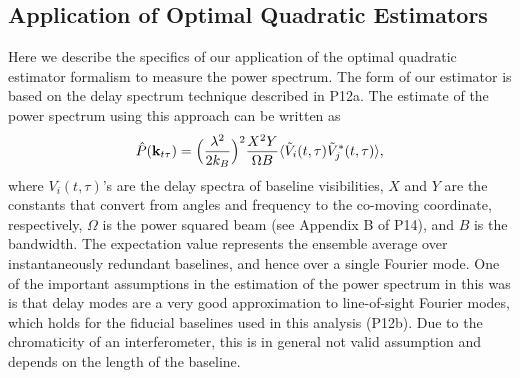 \documentclass[twocolumn,numberedappendix]{emulateapj} \shorttitle{PSA64}
\begin{document}
\subsection{Application of Optimal Quadratic Estimators}
\label{sec:oqe_app}

Here we describe the specifics of our application of the optimal quadratic
estimator formalism to measure the power spectrum. The form of our estimator is
based on the delay spectrum technique described in P12a. The estimate of the
power spectrum using this approach can be written as 
\begin{equation}\label{eqn:delay_pspec}
    \hat{P}(\mathbf{k}_{t\tau}) =
\Big(\frac{\lambda^{2}}{2k_{B}}\Big)^{2}\frac{X^{2}Y}{\Omega
B}\expval{\tilde{V}_{i}(t,\tau)\tilde{V}_{j}^{*}(t,\tau)},
\end{equation}
where $V_{i}(t,\tau)$'s are the delay spectra of baseline visibilities, $X$ and
$Y$ are the constants that convert from angles and frequency to the co-moving
coordinate, respectively, $\Omega$ is the power squared beam (see Appendix B of
P14), and $B$ is the bandwidth. The expectation value represents the ensemble
average over instantaneously redundant baselines, and hence over a single
Fourier mode. One of the important assumptions in the estimation of the power
spectrum in this was is that delay modes are a very good approximation to
line-of-sight Fourier modes, which holds for the fiducial baselines used in this
analysis (P12b). Due to the chromaticity of an interferometer, this is in
general not valid assumption and depends on the length of the baseline.
\end{document}

